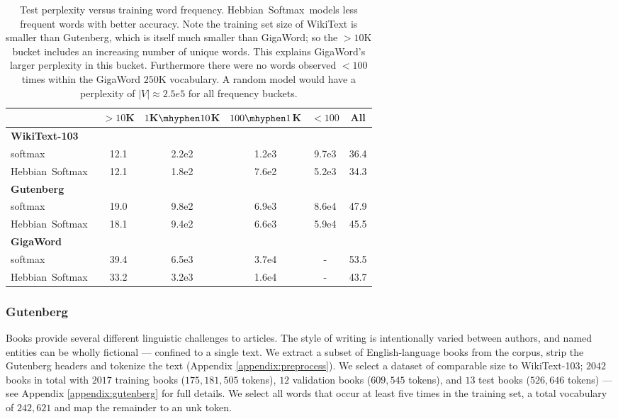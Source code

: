 \documentclass{article} \usepackage{hyperref}
\newcommand{\model}{\hbox{Hebbian Softmax }}
\begin{document}
\begin{table}[]
    \small
    \centering
    \begin{small}
    \caption{Test perplexity versus training word frequency. \model models less frequent words with better accuracy. Note the training set size of WikiText is smaller than Gutenberg, which is itself much smaller than GigaWord; so the $>10$K bucket includes an increasing number of unique words. This explains GigaWord's larger perplexity in this bucket. Furthermore there were no words observed $<100$ times within the GigaWord $250$K vocabulary. A random model would have a perplexity of $|V| \approx 2.5e5$ for all frequency buckets.}
    \end{small}
    \begin{small}
    \begin{sc}
    \setlength{\tabcolsep}{4pt}
    \begin{tabular}{l c c c c c}
    \toprule
     & $>10$K & $1$K$ \mhyphen 10$K & $100 \mhyphen 1$K & $<100$ & All \\ 
     \midrule
    \textbf{WikiText-103} & & & \\
    \scriptsize{softmax} & 12.1 & 2.2e2 & 1.2e3 & 9.7e3 & 36.4 \\ 
    \scriptsize{\model} & 12.1 & 1.8e2 & 7.6e2 & 5.2e3 & 34.3 \\ 
    \midrule
    \textbf{Gutenberg} & & & & \\
    \scriptsize{softmax} & 19.0 & 9.8e2 & 6.9e3 & 8.6e4 & 47.9 \\ 
    \scriptsize{\model} & 18.1 & 9.4e2 & 6.6e3 & 5.9e4 & 45.5 \\ 
    \midrule
    \textbf{GigaWord} & & & & \\
    \scriptsize{softmax} & 39.4 & 6.5e3 & 3.7e4 & - & 53.5  \\ 
    \scriptsize{\model} & 33.2 & 3.2e3 & 1.6e4 & - & 43.7 \\ 
    \bottomrule
    \end{tabular}
    \end{sc}
    \end{small}
    \label{tab:lm_breakdown}
    \vskip -0.1in
\end{table}
\subsubsection{Gutenberg}
Books provide several different linguistic challenges to articles. The style of writing is intentionally varied between authors, and named entities can be wholly fictional --- confined to a single text. We extract a subset of English-language books from the corpus, strip the Gutenberg headers and tokenize the text (Appendix \ref{appendix:preprocess}). We select a dataset of comparable size to WikiText-103; $2042$ books in total with $2017$ training books ($175,181,505$ tokens), $12$ validation books ($609,545$ tokens), and $13$ test books ($526,646$ tokens) --- see Appendix \ref{appendix:gutenberg} for full details. We select all words that occur at least five times in the training set, a total vocabulary of $242,621$ and map the remainder to an unk token.
\end{document}
